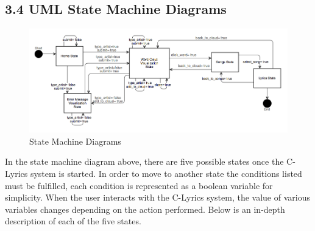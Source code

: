 \documentclass[]{article}
\begin{document}
\subsection{3.4 UML State Machine
Diagrams}\label{uml-state-machine-diagrams}

\begin{figure}[htbp]
\centering
\includegraphics{state_machine_2.jpg}
\caption{State Machine Diagrams}
\end{figure}

In the state machine diagram above, there are five possible states once
the C-Lyrics system is started. In order to move to another state the
conditions listed must be fulfilled, each condition is represented as a
boolean variable for simplicity. When the user interacts with the
C-Lyrics system, the value of various variables changes depending on the
action performed. Below is an in-depth description of each of the five
states.
\end{document}
